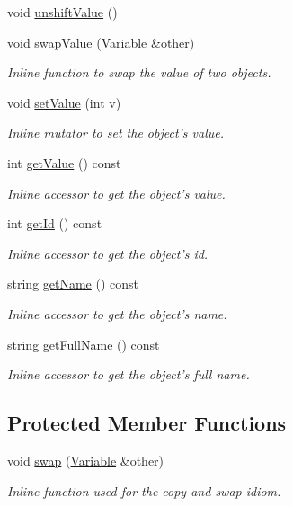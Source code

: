 \begin{DoxyCompactItemize}
\item 
void \hyperlink{classghost_1_1Variable_a3bebc2cc15609a5280a4949d63f7405d}{unshift\-Value} ()
\item 
void \hyperlink{classghost_1_1Variable_a8186ea296b868d44656be01e94b9aa80}{swap\-Value} (\hyperlink{classghost_1_1Variable}{Variable} \&other)
\begin{DoxyCompactList}\small\item\em Inline function to swap the value of two objects. \end{DoxyCompactList}\item 
void \hyperlink{classghost_1_1Variable_a6fe0abafde2231f18074ecab6d7325cd}{set\-Value} (int v)
\begin{DoxyCompactList}\small\item\em Inline mutator to set the object's value. \end{DoxyCompactList}\item 
int \hyperlink{classghost_1_1Variable_ae6dcadf662fc318265a9741d91a0e56e}{get\-Value} () const 
\begin{DoxyCompactList}\small\item\em Inline accessor to get the object's value. \end{DoxyCompactList}\item 
int \hyperlink{classghost_1_1Variable_af5128e3efaa50a99c5fe478496ab9a61}{get\-Id} () const 
\begin{DoxyCompactList}\small\item\em Inline accessor to get the object's id. \end{DoxyCompactList}\item 
string \hyperlink{classghost_1_1Variable_a89050a5f0798151d4b0a369339be9287}{get\-Name} () const 
\begin{DoxyCompactList}\small\item\em Inline accessor to get the object's name. \end{DoxyCompactList}\item 
string \hyperlink{classghost_1_1Variable_a179c5f5625d78740335fe11893811921}{get\-Full\-Name} () const 
\begin{DoxyCompactList}\small\item\em Inline accessor to get the object's full name. \end{DoxyCompactList}\end{DoxyCompactItemize}
\subsection*{Protected Member Functions}
\begin{DoxyCompactItemize}
\item 
void \hyperlink{classghost_1_1Variable_a01b3dfd2e865fed19b5edf0ced7d74bc}{swap} (\hyperlink{classghost_1_1Variable}{Variable} \&other)
\begin{DoxyCompactList}\small\item\em Inline function used for the copy-\/and-\/swap idiom. \end{DoxyCompactList}\end{DoxyCompactItemize}
